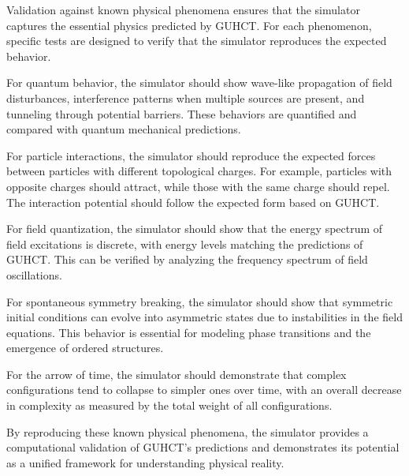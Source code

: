 \documentclass[11pt,a4paper]{article}
\makeatletter
\renewenvironment{proof}[1][\proofname]{\par
  \pushQED{\qed}%
  \normalfont \topsep6\p@\@plus6\p@\relax
  \trivlist
  \item[\hskip\labelsep
        \itshape
    #1\@addpunct{.}]\ignorespaces
}{%
  \popQED\endtrivlist\@endpefalse
}
\makeatother
\begin{document}
\begin{proof}
Validation against known physical phenomena ensures that the simulator captures the essential physics predicted by GUHCT. For each phenomenon, specific tests are designed to verify that the simulator reproduces the expected behavior.

For quantum behavior, the simulator should show wave-like propagation of field disturbances, interference patterns when multiple sources are present, and tunneling through potential barriers. These behaviors are quantified and compared with quantum mechanical predictions.

For particle interactions, the simulator should reproduce the expected forces between particles with different topological charges. For example, particles with opposite charges should attract, while those with the same charge should repel. The interaction potential should follow the expected form based on GUHCT.

For field quantization, the simulator should show that the energy spectrum of field excitations is discrete, with energy levels matching the predictions of GUHCT. This can be verified by analyzing the frequency spectrum of field oscillations.

For spontaneous symmetry breaking, the simulator should show that symmetric initial conditions can evolve into asymmetric states due to instabilities in the field equations. This behavior is essential for modeling phase transitions and the emergence of ordered structures.

For the arrow of time, the simulator should demonstrate that complex configurations tend to collapse to simpler ones over time, with an overall decrease in complexity as measured by the total weight of all configurations.

By reproducing these known physical phenomena, the simulator provides a computational validation of GUHCT's predictions and demonstrates its potential as a unified framework for understanding physical reality.
\end{proof}
\end{document}
